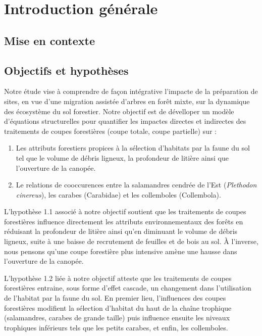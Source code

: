 \chapter*{Introduction générale}         %
\label{chap-introduction}       %

\section*{Mise en contexte}
\label{sec:contexte}

\section*{Objectifs et hypothèses}
\label{sec:objectifs}

Notre étude vise à comprendre de façon intégrative l'impacte de la préparation de sites, en vue d'une migration assistée d'arbres en forêt mixte, sur la dynamique des écosystème du sol forestier.
Notre objectif est de dévelloper un modèle d'équations structurelles pour quantifier les impactes directes et indirectes des traitements de coupes forestières (coupe totale, coupe partielle) sur : 

\begin{enumerate}
    \item Les attributs forestiers propices à la sélection d'habitats par la faune du sol tel que le volume de débris ligneux, la profondeur de litière ainsi que l'ouverture de la canopée. 
    \item Le relations de cooccurences entre la salamandres cendrée de l'Est (\textit{Plethodon cinereus}), les carabes (Carabidae) et les collemboles (Collembola).
\end{enumerate}

L'hypothèse 1.1 associé à notre objectif soutient que les traitements de coupes forestières influence directement les attributs environnementaux des forêts en 
réduisant la profondeur de litière ainsi qu'en diminuant le volume de débris ligneux, suite à une baisse de recrutement de feuilles et de bois au sol. 
À l'inverse, nous pensons qu'une coupe forestière plus intensive amène une hausse dans l'ouverture de la canopée.

L'hypothèse 1.2 liée à notre objectif atteste que les traitements de coupes forestières entraine, sous forme d'effet cascade, un changement dans l'utilisation de l'habitat par la faune du sol. 
En premier lieu, l'influences des coupes forestières modifient la sélection d'habitat du haut de la chaîne trophique (salamandres, carabes de grande taille)
puis influence ensuite les niveaux trophiques inférieurs tels que les petits carabes, 
et enfin, les collemboles.

\cleardoublepage



